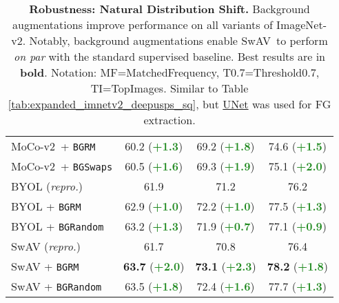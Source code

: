 \documentclass[twoside,11pt]{article}
\newcommand{\bgrm}{\texttt{BG\textunderscore RM}}
\newcommand{\bgswaps}{\texttt{BG\textunderscore Swaps}}
\newcommand{\bgrand}{\texttt{BG\textunderscore Random}}
\newcommand{\moco}{MoCo-v2}
\newcommand{\swav}{SwAV}
\begin{document}
\begin{table}
\begin{tabular}{lccc}
    \moco~+ \bgrm 
    & 60.2 (\textbf{\textcolor{ForestGreen}{+1.3}}) & 69.2 (\textbf{\textcolor{ForestGreen}{+1.8}}) 
    & 74.6 (\textbf{\textcolor{ForestGreen}{+1.5}}) \\
    \moco~+ \bgswaps 
    & 60.5 (\textbf{\textcolor{ForestGreen}{+1.6}}) & 69.3 (\textbf{\textcolor{ForestGreen}{+1.9}}) 
    & 75.1 (\textbf{\textcolor{ForestGreen}{+2.0}}) \\
    BYOL {\scriptsize{(\textit{repro.})}} & 61.9 & 71.2 & 76.2\\
    BYOL + \bgrm & 62.9 (\textbf{\textcolor{ForestGreen}{+1.0}}) & 72.2  (\textbf{\textcolor{ForestGreen}{+1.0}})& 77.5 (\textbf{\textcolor{ForestGreen}{+1.3}})   \\
    BYOL + \bgrand & 63.2 (\textbf{\textcolor{ForestGreen}{+1.3}}) & 71.9 (\textbf{\textcolor{ForestGreen}{+0.7}}) & 77.1 (\textbf{\textcolor{ForestGreen}{+0.9}})   \\
    SwAV {\scriptsize{(\textit{repro.})}} & 61.7 & 70.8 & 76.4 \\
    SwAV + \bgrm  & \textbf{63.7} (\textbf{\textcolor{ForestGreen}{+2.0}}) & \textbf{73.1} (\textbf{\textcolor{ForestGreen}{+2.3}}) & \textbf{78.2} (\textbf{\textcolor{ForestGreen}{+1.8}}) \\
    SwAV + \bgrand  & 63.5 (\textbf{\textcolor{ForestGreen}{+1.8}}) & 72.4 (\textbf{\textcolor{ForestGreen}{+1.6}}) & 77.7 (\textbf{\textcolor{ForestGreen}{+1.3}})  \\
    \bottomrule
    \end{tabular}
    \caption{
    \textbf{Robustness: Natural Distribution Shift.} Background augmentations improve performance on all variants of ImageNet-v2. Notably, background augmentations enable \swav~to perform \textit{on par} with the standard supervised baseline. Best results are in \textbf{bold}. Notation: MF=MatchedFrequency, T0.7=Threshold0.7, TI=TopImages. Similar to Table \ref{tab:expanded_imnetv2_deepusps_sq}, but \underline{UNet} was used for FG extraction.
    }
    \label{tab:expanded_imnetv2_u2net}
\end{table}
\end{document}
